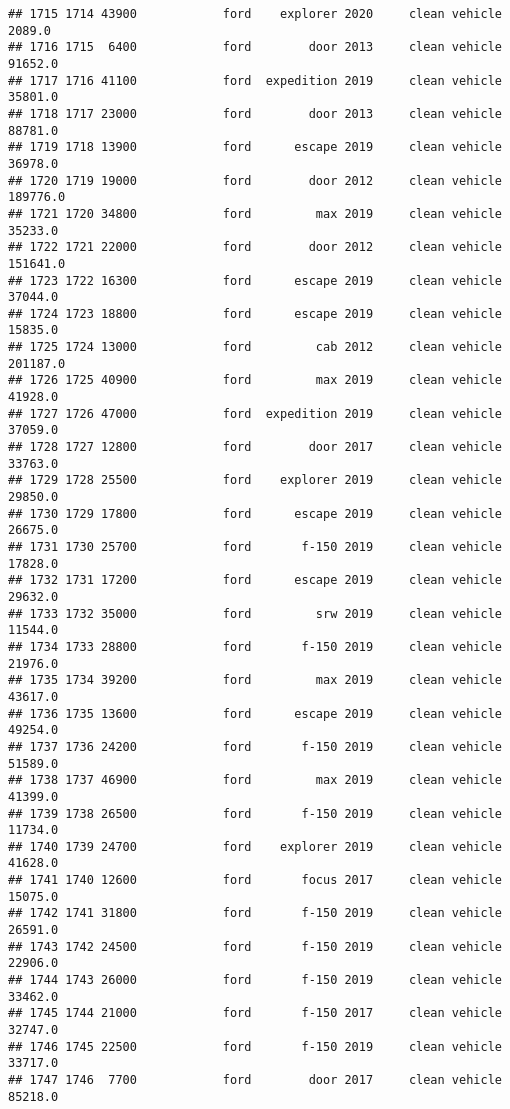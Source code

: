 \documentclass[
]{article}
\begin{document}
\begin{verbatim}
## 1715 1714 43900            ford    explorer 2020     clean vehicle    2089.0
## 1716 1715  6400            ford        door 2013     clean vehicle   91652.0
## 1717 1716 41100            ford  expedition 2019     clean vehicle   35801.0
## 1718 1717 23000            ford        door 2013     clean vehicle   88781.0
## 1719 1718 13900            ford      escape 2019     clean vehicle   36978.0
## 1720 1719 19000            ford        door 2012     clean vehicle  189776.0
## 1721 1720 34800            ford         max 2019     clean vehicle   35233.0
## 1722 1721 22000            ford        door 2012     clean vehicle  151641.0
## 1723 1722 16300            ford      escape 2019     clean vehicle   37044.0
## 1724 1723 18800            ford      escape 2019     clean vehicle   15835.0
## 1725 1724 13000            ford         cab 2012     clean vehicle  201187.0
## 1726 1725 40900            ford         max 2019     clean vehicle   41928.0
## 1727 1726 47000            ford  expedition 2019     clean vehicle   37059.0
## 1728 1727 12800            ford        door 2017     clean vehicle   33763.0
## 1729 1728 25500            ford    explorer 2019     clean vehicle   29850.0
## 1730 1729 17800            ford      escape 2019     clean vehicle   26675.0
## 1731 1730 25700            ford       f-150 2019     clean vehicle   17828.0
## 1732 1731 17200            ford      escape 2019     clean vehicle   29632.0
## 1733 1732 35000            ford         srw 2019     clean vehicle   11544.0
## 1734 1733 28800            ford       f-150 2019     clean vehicle   21976.0
## 1735 1734 39200            ford         max 2019     clean vehicle   43617.0
## 1736 1735 13600            ford      escape 2019     clean vehicle   49254.0
## 1737 1736 24200            ford       f-150 2019     clean vehicle   51589.0
## 1738 1737 46900            ford         max 2019     clean vehicle   41399.0
## 1739 1738 26500            ford       f-150 2019     clean vehicle   11734.0
## 1740 1739 24700            ford    explorer 2019     clean vehicle   41628.0
## 1741 1740 12600            ford       focus 2017     clean vehicle   15075.0
## 1742 1741 31800            ford       f-150 2019     clean vehicle   26591.0
## 1743 1742 24500            ford       f-150 2019     clean vehicle   22906.0
## 1744 1743 26000            ford       f-150 2019     clean vehicle   33462.0
## 1745 1744 21000            ford       f-150 2017     clean vehicle   32747.0
## 1746 1745 22500            ford       f-150 2019     clean vehicle   33717.0
## 1747 1746  7700            ford        door 2017     clean vehicle   85218.0

\end{verbatim}
\end{document}

